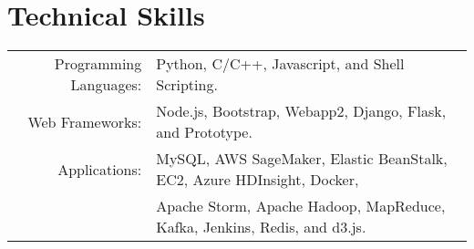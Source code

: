 \section{Technical Skills}
\renewcommand{\arraystretch}{1}%
\begin{tabular}{rl}

Programming Languages: &  Python, C/C++, Javascript, and Shell Scripting.\\
Web Frameworks: & Node.js, Bootstrap, Webapp2, Django, Flask, and Prototype.\\
Applications: & MySQL, AWS SageMaker, Elastic BeanStalk, EC2, Azure HDInsight, Docker,\\
& Apache Storm, Apache Hadoop, MapReduce, Kafka, Jenkins, Redis, and d3.js.\\
\end{tabular}
\vspace{5pt}
